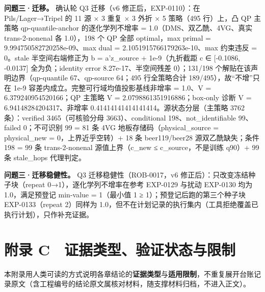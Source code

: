 \documentclass[11pt,a4paper]{article}
\begin{document}
\textbf{问题三·迁移。} 确认轮 Q3 迁移（v6 修正后，EXP-0110）：在
Pils/Lager→Tripel 的 11 源 × 3 重复 × 3 外折 × 5 策略（495 行）上，凸 QP
主策略 qp-quantile-anchor 的逐化学列不增率 = 1.0（DMS、双乙酰、4VG、真实
trans-2-nonenal 各 1.0），198 个 QP 全部 optimal，max primal =
9.994750582720258e-09、max dual = 2.1051915766179263e-10、max 约束违反 =
0。stale 半空间右端修正为 b = a'z\_source + 1e-9（九折截距 c ∈
{[}-0.1086, -0.0137{]} 全为负；identity error 8.27e-17、半空间残差
0）；131/198 个解贴在该声明边界（qp-quantile 67、qp-source 64；495
行全策略合计 189/495），故``不增''只在 1e-9
容差内成立。完整可行域均值投影基线非增率 = 1.0、V =
6.379240954520166；QP 主策略 V = 2.0798861351916886；box-only 诊断 V =
6.94148284204317、非增率 0.41414141414141414。源状态分层（主策略 3762
条）：verified 3465（可核验分母 3663）、conditional
198、not\_identifiable 99、failed 0；不可识别 99 = 81 条 4VG
地板存储码（physical\_source = physical\_new = 0，上界近乎空转）+ 18 条
beer119/beer28 源双乙酰缺失；条件 198 = 99 条 trans-2-nonenal
源值上界（c\_new ≤ c\_source，不是训练 q90）+ 99 条 stale\_hops
代理判定。

\textbf{问题三·迁移稳健性。} Q3 迁移稳健性（ROB-0017，v6
修正后）：只改变冻结种子块（repeat 0→1），逐化学列不增率在参考 EXP-0129
与扰动 EXP-0130 均为 1.0，满足预登记 min-value = 1（最小值 1 ≥
1）；预登记后跑的第三个种子块 EXP-0133（repeat 2）同样为
1.0，但不在计划记录的执行集内（工具拒绝覆盖已执行计划），只作补充证据。

\section*{附录
C　证据类型、验证状态与限制}\label{ux9644ux5f55-c-ux8bc1ux636eux7c7bux578bux9a8cux8bc1ux72b6ux6001ux4e0eux9650ux5236}

本附录用人类可读的方式说明各章结论的\textbf{证据类型}与\textbf{适用限制}，不重复展开台账记录原文（含工程编号的结论原文属核对材料，随支撑材料归档，不进入正文）。
\end{document}
